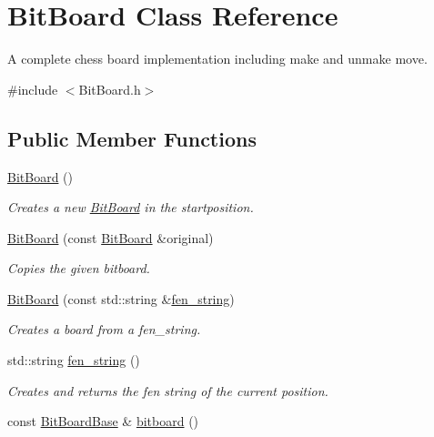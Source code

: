\hypertarget{classBitBoard}{}\section{Bit\+Board Class Reference}
\label{classBitBoard}


A complete chess board implementation including make and unmake move.  




{\ttfamily \#include $<$Bit\+Board.\+h$>$}

\subsection*{Public Member Functions}
\begin{DoxyCompactItemize}
\item 
\mbox{\label{classBitBoard_a16e5151e747beb21473ab790d60e4e36}} 
\hyperlink{classBitBoard_a16e5151e747beb21473ab790d60e4e36}{Bit\+Board} ()
\begin{DoxyCompactList}\small\item\em Creates a new \hyperlink{classBitBoard}{Bit\+Board} in the startposition. \end{DoxyCompactList}\item 
\hyperlink{classBitBoard_aeaa1a16349090d393b00decbfe8eb6a6}{Bit\+Board} (const \hyperlink{classBitBoard}{Bit\+Board} \&original)
\begin{DoxyCompactList}\small\item\em Copies the given bitboard. \end{DoxyCompactList}\item 
\hyperlink{classBitBoard_aad0762329ff5f8455e177a6b58fbc64e}{Bit\+Board} (const std\+::string \&\hyperlink{classBitBoard_a5d5b2eea456fee2ce5246e1354fc4307}{fen\+\_\+string})
\begin{DoxyCompactList}\small\item\em Creates a board from a fen\+\_\+string. \end{DoxyCompactList}\item 
std\+::string \hyperlink{classBitBoard_a5d5b2eea456fee2ce5246e1354fc4307}{fen\+\_\+string} ()
\begin{DoxyCompactList}\small\item\em Creates and returns the fen string of the current position. \end{DoxyCompactList}\item 
const \hyperlink{structBitBoardBase}{Bit\+Board\+Base} \& \hyperlink{classBitBoard_ac8a51ff161d0271a81362c179465db69}{bitboard} ()

\end{DoxyCompactItemize}
